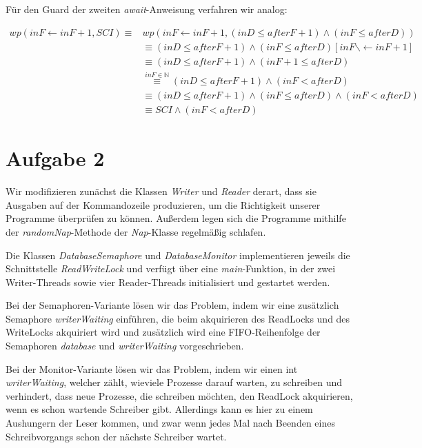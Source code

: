 \documentclass[numbers=noendperiod]{scrartcl}
\begin{document}
Für den Guard der zweiten \textit{await}-Anweisung verfahren wir analog:

\begin{align}
	wp(inF \gets inF + 1, SCI) \equiv &wp(inF \gets inF +1, (inD \le afterF +1 ) \land (inF \le afterD))\\
	&\equiv (inD \le afterF + 1) \land (inF \le afterD) [inF \backslash \gets inF + 1]\\
	&\equiv (inD \le afterF + 1) \land (inF +1 \le afterD)\\
	&\overset{inF \in \mathbb{N}}{\equiv} (inD \le afterF+1) \land (inF < afterD)\\
	&\equiv (inD \le afterF + 1) \land (inF \le afterD) \land (inF < afterD)\\\
	&\equiv SCI \land (inF < afterD)
\end{align}

\section*{Aufgabe 2}

Wir modifizieren zunächst die Klassen \textit{Writer} und \textit{Reader} derart, dass sie Ausgaben auf der Kommandozeile produzieren, um die Richtigkeit unserer Programme überprüfen zu können. Außerdem legen sich die Programme mithilfe der \textit{randomNap}-Methode der \textit{Nap}-Klasse regelmäßig schlafen.



Die Klassen \textit{DatabaseSemaphore} und \textit{DatabaseMonitor} implementieren jeweils die Schnittstelle \textit{ReadWriteLock} und verfügt über eine \textit{main}-Funktion, in der zwei Writer-Threads sowie vier Reader-Threads initialisiert und gestartet werden.

Bei der Semaphoren-Variante lösen wir das Problem, indem wir eine zusätzlich Semaphore \textit{writerWaiting} einführen, die beim akquirieren des ReadLocks und des WriteLocks akquiriert wird und zusätzlich wird eine FIFO-Reihenfolge der Semaphoren \textit{database} und \textit{writerWaiting} vorgeschrieben.


Bei der Monitor-Variante lösen wir das Problem, indem wir einen int \textit{writerWaiting}, welcher zählt, wieviele Prozesse darauf warten, zu schreiben und verhindert, dass neue Prozesse, die schreiben möchten, den ReadLock akquirieren, wenn es schon wartende Schreiber gibt. Allerdings kann es hier zu einem Aushungern der Leser kommen, und zwar wenn jedes Mal nach Beenden eines Schreibvorgangs schon der nächste Schreiber wartet.
\end{document}
